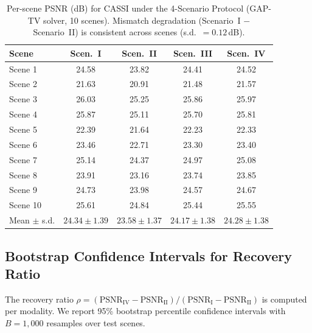 \documentclass[11pt]{article}
\theoremstyle{definition}
\begin{document}
\begin{table}[!ht]
\centering\small
\caption{Per-scene PSNR (dB) for CASSI under the 4-Scenario Protocol (GAP-TV solver, 10 scenes). Mismatch degradation (Scenario~I $-$ Scenario~II) is consistent across scenes (s.d.\ $= 0.12$\,dB).}
\label{tab:perscene_cassi}
\begin{tabular}{@{}lcccc@{}}
\toprule
Scene & Scen.~I & Scen.~II & Scen.~III & Scen.~IV \\
\midrule
Scene 1  & 24.58 & 23.82 & 24.41 & 24.52 \\
Scene 2  & 21.63 & 20.91 & 21.48 & 21.57 \\
Scene 3  & 26.03 & 25.25 & 25.86 & 25.97 \\
Scene 4  & 25.87 & 25.11 & 25.70 & 25.81 \\
Scene 5  & 22.39 & 21.64 & 22.23 & 22.33 \\
Scene 6  & 23.46 & 22.71 & 23.30 & 23.40 \\
Scene 7  & 25.14 & 24.37 & 24.97 & 25.08 \\
Scene 8  & 23.91 & 23.16 & 23.74 & 23.85 \\
Scene 9  & 24.73 & 23.98 & 24.57 & 24.67 \\
Scene 10 & 25.61 & 24.84 & 25.44 & 25.55 \\
\midrule
Mean $\pm$ s.d. & $24.34 \pm 1.39$ & $23.58 \pm 1.37$ & $24.17 \pm 1.38$ & $24.28 \pm 1.38$ \\
\bottomrule
\end{tabular}
\end{table}

\subsection{Bootstrap Confidence Intervals for Recovery Ratio}

The recovery ratio $\rho = (\mathrm{PSNR}_{\mathrm{IV}} - \mathrm{PSNR}_{\mathrm{II}}) / (\mathrm{PSNR}_{\mathrm{I}} - \mathrm{PSNR}_{\mathrm{II}})$ is computed per modality. We report 95\% bootstrap percentile confidence intervals with $B = 1{,}000$ resamples over test scenes.
\end{document}
